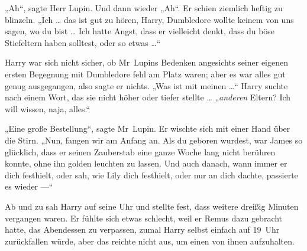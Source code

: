 „Ah“, sagte Herr Lupin. Und dann wieder
„Ah“. Er schien ziemlich heftig zu blinzeln.
„Ich … das ist gut zu hören, Harry, Dumbledore wollte keinem von uns sagen, wo du bist … Ich hatte Angst, dass er vielleicht denkt, dass du böse Stiefeltern haben solltest, oder so etwas …“

Harry war sich nicht sicher, ob Mr~Lupins Bedenken angesichts seiner eigenen ersten Begegnung mit Dumbledore fehl am Platz waren; aber es war alles gut genug ausgegangen, also sagte er nichts.
„Was ist mit meinen …“ Harry suchte nach einem Wort, das sie nicht höher oder tiefer stellte …
„\emph{anderen} Eltern? Ich will wissen, naja, alles.“

„Eine große Bestellung“, sagte Mr~Lupin. Er wischte sich mit einer Hand über die Stirn.
„Nun, fangen wir am Anfang an. Als du geboren wurdest, war James so glücklich, dass er seinen Zauberstab eine ganze Woche lang nicht berühren konnte, ohne ihn golden leuchten zu lassen. Und auch danach, wann immer er dich festhielt, oder sah, wie Lily dich festhielt, oder nur an dich dachte, passierte es wieder —“

\later

Ab und zu sah Harry auf seine Uhr und stellte fest, dass weitere dreißig Minuten vergangen waren. Er fühlte sich etwas schlecht, weil er Remus dazu gebracht hatte, das Abendessen zu verpassen, zumal Harry selbst einfach auf 19~Uhr zurückfallen würde, aber das reichte nicht aus, um einen von ihnen aufzuhalten.

